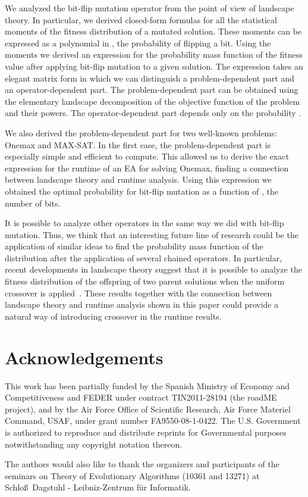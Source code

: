 \documentclass{article}
\begin{document}
We analyzed the bit-flip mutation operator from the point of view of landscape theory. In particular, we derived closed-form formulas for all the statistical moments of the fitness distribution of a mutated solution. These moments can be expressed as a polynomial in , the probability of flipping a bit. Using the moments we derived an expression for the probability mass function of the fitness value after applying bit-flip mutation to a given solution. The expression takes an elegant matrix form in which we can distinguish a problem-dependent part and an operator-dependent part. The problem-dependent part can be obtained using the elementary landscape decomposition of the objective function of the problem and their powers. The operator-dependent part depends only on the probability .

We also derived the problem-dependent part for two well-known problems: Onemax and MAX-SAT. In the first case, the problem-dependent part is especially simple and efficient to compute. This allowed us to derive the exact expression for the runtime of an  EA for solving Onemax, finding a connection between landscape theory and runtime analysis. Using this expression we obtained the optimal probability for bit-flip mutation as a function of , the number of bits.

It is possible to analyze other operators in the same way we did with bit-flip mutation. Thus, we think that an interesting future line of research could be the application of similar ideas to find the probability mass function of the distribution after the application of several chained operators. In particular, recent developments in landscape theory suggest that it is possible to analyze the fitness distribution of the offspring of two parent solutions when the uniform crossover is applied~\citep{Chicano2012crossover}. These results together with the connection between landscape theory and runtime analysis shown in this paper could provide a natural way of introducing crossover in the runtime results. 


\section{Acknowledgements}

This work has been partially funded by the Spanish Ministry of Economy and Competitiveness and FEDER under contract TIN2011-28194 (the
roadME project), and by the Air Force Office of
Scientific Research, Air Force Materiel Command, USAF, under grant
number FA9550-08-1-0422. The U.S. Government is authorized to
reproduce and distribute reprints for Governmental purposes
notwithstanding any copyright notation thereon.

The authors would also like to thank the organizers and participants
of the seminars on Theory of Evolutionary Algorithms (10361 and 13271) at
Schlo\ss\ Dagstuhl - Leibniz-Zentrum f\"ur Informatik.




\end{document}
